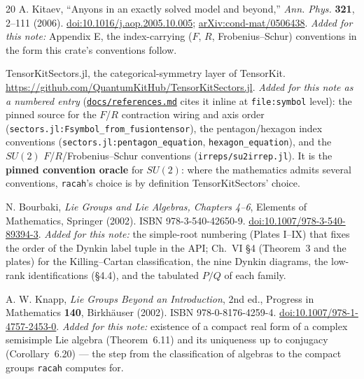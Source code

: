 \documentclass[11pt,a4paper]{article}
\theoremstyle{plain}
\theoremstyle{definition}
\newcommand{\code}[1]{\texttt{#1}}
\newcommand{\refsmd}{\href{https://github.com/Ryo-wtnb11/fusion-symbols/blob/main/docs/references.md}{\code{docs/references.md}}}
\begin{document}
\begin{thebibliography}{20}
 A. Kitaev, ``Anyons in an exactly solved model and beyond,''
\emph{Ann. Phys.} \textbf{321}, 2--111 (2006).
\href{https://doi.org/10.1016/j.aop.2005.10.005}{doi:10.1016/j.aop.2005.10.005};
\href{https://arxiv.org/abs/cond-mat/0506438}{arXiv:cond-mat/0506438}.
\emph{Added for this note:} Appendix E, the index-carrying ($F$, $R$,
Frobenius--Schur) conventions in the form this crate's conventions follow.

 TensorKitSectors.jl, the categorical-symmetry layer of TensorKit.
\url{https://github.com/QuantumKitHub/TensorKitSectors.jl}.
\emph{Added for this note as a numbered entry} (\refsmd{} cites it inline at
\code{file:symbol} level): the pinned source for the $F$/$R$ contraction wiring
and axis order (\code{sectors.jl:Fsymbol\_from\_fusiontensor}), the
pentagon/hexagon index conventions
(\code{sectors.jl:pentagon\_equation}, \code{hexagon\_equation}), and the
$SU(2)$ $F$/$R$/Frobenius--Schur conventions
(\code{irreps/su2irrep.jl}). It is the \textbf{pinned convention oracle} for
$SU(2)$: where the mathematics admits several conventions, \code{racah}'s
choice is by definition TensorKitSectors' choice.

 N. Bourbaki, \emph{Lie Groups and Lie Algebras,
Chapters 4--6}, Elements of Mathematics, Springer (2002).
ISBN 978-3-540-42650-9.
\href{https://doi.org/10.1007/978-3-540-89394-3}{doi:10.1007/978-3-540-89394-3}.
\emph{Added for this note:} the simple-root numbering (Plates I--IX) that fixes
the order of the Dynkin label tuple in the API; Ch.~VI \S4 (Theorem~3 and the
plates) for the Killing--Cartan classification, the nine Dynkin diagrams, the
low-rank identifications (\S4.4), and the tabulated $P/Q$ of each family.

 A. W. Knapp, \emph{Lie Groups Beyond an Introduction},
2nd ed., Progress in Mathematics \textbf{140}, Birkh\"auser (2002).
ISBN 978-0-8176-4259-4.
\href{https://doi.org/10.1007/978-1-4757-2453-0}{doi:10.1007/978-1-4757-2453-0}.
\emph{Added for this note:} existence of a compact real form of a complex
semisimple Lie algebra (Theorem~6.11) and its uniqueness up to conjugacy
(Corollary~6.20) --- the step from the classification of algebras to the
compact groups \code{racah} computes for.

\end{thebibliography}
\end{document}
